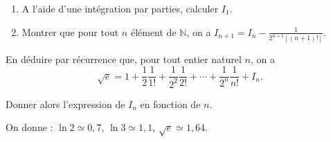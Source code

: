 \begin{description}
\begin{enumerate}
                        \item A l'aide d'une int\'egration par parties, calculer $I_1$.
                        \item Montrer que pour tout $n$ \'el\'ement de $\mathbb{N}$, on a 
                              $I_{n+1} = I_n - \frac{1}{2^{n+1} [(n+1)!]}$.
                  \end{enumerate}
            \item En d\'eduire par r\'ecurrence que, pour tout entier naturel $n$, on a
                  \[
                  \sqrt{e}=1+\frac{1}{2}\frac{1}{1!}
                            +\frac{1}{2^2}\frac{1}{2!}
                            +\cdots
                            +\frac{1}{2^n}\frac{1}{n!}+I_n.
                  \]
            \item Donner alors l'expression de $I_n$ en fonction de $n$.
      \end{description}
      \begin{center}
            On donne : $\ln 2 \simeq 0,7$, $\ln 3 \simeq 1,1$, $\sqrt{e} \simeq 1,64$.
      \end{center}


































